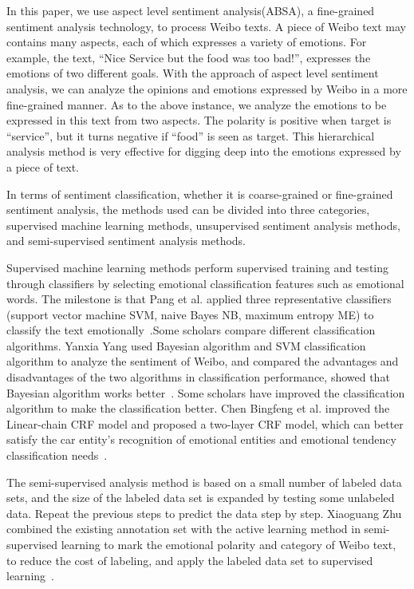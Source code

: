 \documentclass{ieeeaccess}
\begin{document}
In this paper, we use aspect level sentiment analysis(ABSA), a fine-grained sentiment analysis technology, to process Weibo texts. A piece of Weibo text may contains many aspects, each of which expresses a variety of emotions. For example, the text, “Nice Service but the food was too bad!”, expresses the emotions of two different goals. With the approach of aspect level sentiment analysis, we can analyze the opinions and emotions expressed by Weibo in a more fine-grained manner. As to the above instance, we analyze the emotions to be expressed in this text from two aspects. The polarity is positive when target is “service”, but it turns negative if “food” is seen as target. This hierarchical analysis method is very effective for digging deep into the emotions expressed by a piece of text.

In terms of sentiment classification, whether it is coarse-grained or fine-grained sentiment analysis, the methods used can be divided into three categories, supervised machine learning methods, unsupervised sentiment analysis methods, and semi-supervised sentiment analysis methods.

Supervised machine learning methods perform supervised training and testing through classifiers by selecting emotional classification features such as emotional words. The milestone is that Pang et al. applied three representative classifiers (support vector machine SVM, naive Bayes NB, maximum entropy ME) to classify the text emotionally~\cite{DBLP:conf/emnlp/PangLV02}.Some scholars compare different classification algorithms. Yanxia Yang used Bayesian algorithm and SVM classification algorithm to analyze the sentiment of Weibo, and compared the advantages and disadvantages of the two algorithms in classification performance, showed that Bayesian algorithm works better~\cite{yang2015microblog}. Some scholars have improved the classification algorithm to make the classification better. Chen Bingfeng et al. improved the Linear-chain CRF model and proposed a two-layer CRF model, which can better satisfy the car entity's recognition of emotional entities and emotional tendency classification needs~\cite{Chen2017A}.

The semi-supervised analysis method is based on a small number of labeled data sets, and the size of the labeled data set is expanded by testing some unlabeled data. Repeat the previous steps to predict the data step by step. Xiaoguang Zhu combined the existing annotation set with the active learning method in semi-supervised learning to mark the emotional polarity and category of Weibo text, to reduce the cost of labeling, and apply the labeled data set to supervised learning~\cite{zhu2013chinese}.
\end{document}
